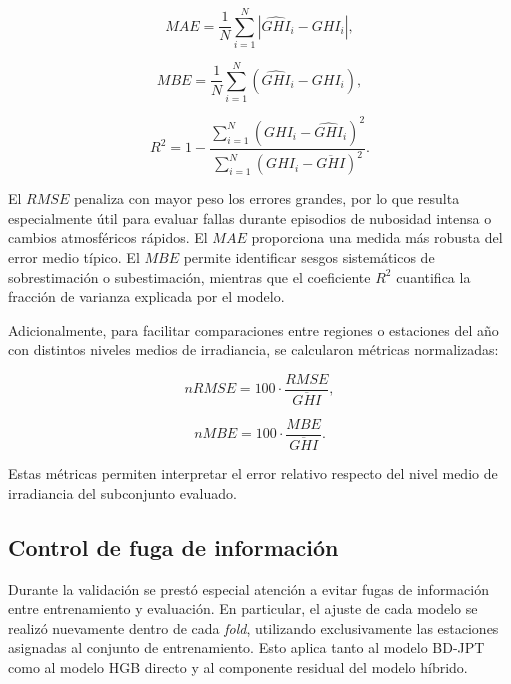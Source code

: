 \documentclass[../main.tex]{subfiles}
\begin{document}
\begin{equation}
MAE =
\frac{1}{N}
\sum_{i=1}^{N}
\left|
\hat{GHI}_i - GHI_i
\right|,
\end{equation}

\begin{equation}
MBE =
\frac{1}{N}
\sum_{i=1}^{N}
\left(
\hat{GHI}_i - GHI_i
\right),
\end{equation}

\begin{equation}
R^2 = 1 - \frac{ \sum_{i=1}^{N} \left( GHI_i - \hat{GHI}_i \right)^2 }{ \sum_{i=1}^{N} \left( GHI_i - \overline{GHI} \right)^2 }.
\end{equation}

El $RMSE$ penaliza con mayor peso los errores grandes, por lo que resulta especialmente útil para evaluar fallas durante episodios de nubosidad intensa o cambios atmosféricos rápidos. El $MAE$ proporciona una medida más robusta del error medio típico. El $MBE$ permite identificar sesgos sistemáticos de sobrestimación o subestimación, mientras que el coeficiente $R^2$ cuantifica la fracción de varianza explicada por el modelo.

Adicionalmente, para facilitar comparaciones entre regiones o estaciones del año con distintos niveles medios de irradiancia, se calcularon métricas normalizadas:

\begin{equation}
nRMSE =
100 \cdot
\frac{RMSE}{\overline{GHI}},
\end{equation}

\begin{equation}
nMBE =
100 \cdot
\frac{MBE}{\overline{GHI}}.
\end{equation}

Estas métricas permiten interpretar el error relativo respecto del nivel medio de irradiancia del subconjunto evaluado.

\subsection{Control de fuga de información}

Durante la validación se prestó especial atención a evitar fugas de información entre entrenamiento y evaluación. En particular, el ajuste de cada modelo se realizó nuevamente dentro de cada \textit{fold}, utilizando exclusivamente las estaciones asignadas al conjunto de entrenamiento. Esto aplica tanto al modelo BD-JPT como al modelo HGB directo y al componente residual del modelo híbrido.
\end{document}
